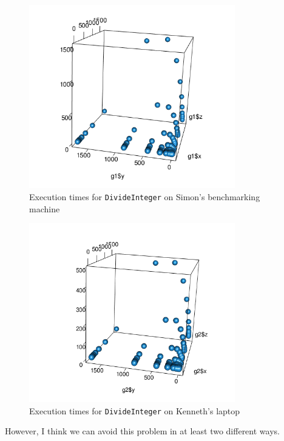 \documentclass[a4paper]{article}
\begin{document}
\begin{figure}
\centering
  \includegraphics[width=0.8\textwidth]{figures/Simon.png}
  \caption{Execution times for \texttt{DivideInteger} on Simon's benchmarking machine}
  \label{fig:div-plot-Simon}
\end{figure}

\begin{figure}
\centering
  \includegraphics[width=0.8\textwidth]{figures/kwxm.png}
  \caption{Execution times for \texttt{DivideInteger} on Kenneth's laptop}
  \label{fig:div-plot-kwxm}
\end{figure}



However, I think we can avoid this problem in at least two different
ways.
\end{document}
